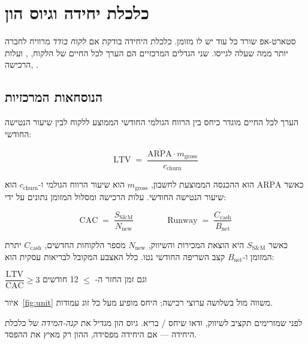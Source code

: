 \chapter{כלכלת יחידה וגיוס הון}
\label{chap:economics}

סטארט-אפ שורד כל עוד יש לו מזומן. כלכלת היחידה  בודקת אם
\emph{לקוח בודד} מרוויח לחברה יותר ממה שעלה לגייסו. שני הגדלים המרכזיים הם
הערך לכל החיים של הלקוח, , ועלות הרכישה, .

\section{הנוסחאות המרכזיות}

הערך לכל החיים מוגדר כיחס בין הרווח הגולמי החודשי הממוצע ללקוח לבין שיעור
הנטישה החודשי:
\begin{formulabox}
\[ \mathrm{LTV} \;=\; \frac{\overline{\mathrm{ARPA}} \cdot m_{\text{gross}}}{c_{\text{churn}}} \]
\end{formulabox}
כאשר $\overline{\mathrm{ARPA}}$ הוא ההכנסה הממוצעת לחשבון, $m_{\text{gross}}$
הוא שיעור הרווח הגולמי ו-$c_{\text{churn}}$ הוא שיעור הנטישה החודשי. עלות
הרכישה ומסלול המזומן  נתונים על ידי:
\begin{formulabox}
\[ \mathrm{CAC} \;=\; \frac{S_{\text{S\&M}}}{N_{\text{new}}}
   \qquad\qquad
   \mathrm{Runway} \;=\; \frac{C_{\text{cash}}}{B_{\text{net}}} \]
\end{formulabox}
כאשר $S_{\text{S\&M}}$ היא הוצאת המכירות והשיווק, $N_{\text{new}}$ מספר הלקוחות
החדשים, $C_{\text{cash}}$ יתרת המזומן ו-$B_{\text{net}}$ קצב השריפה החודשי
נטו. כלל האצבע המקובל לבריאות עסקית הוא:
\begin{formulabox}
$\dfrac{\mathrm{LTV}}{\mathrm{CAC}} \geq 3$ \qquad וגם \qquad
זמן החזר ה- $\leq$ 12 חודשים
\end{formulabox}

איור~\ref{fig:unit} משווה  מול  בשלושה ערוצי רכישה; היחס מופיע
מעל כל זוג עמודות.

\begin{takeaway}
לפני שמזרימים תקציב לשיווק, ודאו שיחס / בריא. גיוס הון מגדיל
את \emph{קנה-המידה} של כלכלת היחידה — אם היחידה מפסידה, ההון רק מאיץ את ההפסד.
\end{takeaway}

